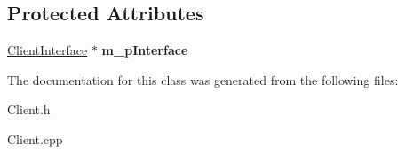 \subsection*{Protected Attributes}
\begin{DoxyCompactItemize}
\item 
\mbox{\label{classTBT_1_1Client_a0b3e41f73f6381600c8ddac129b740f6}} 
\hyperlink{classTBT_1_1ClientInterface}{Client\+Interface} $\ast$ {\bfseries m\+\_\+p\+Interface}
\end{DoxyCompactItemize}


The documentation for this class was generated from the following files\+:\begin{DoxyCompactItemize}
\item 
Client.\+h\item 
Client.\+cpp\end{DoxyCompactItemize}

